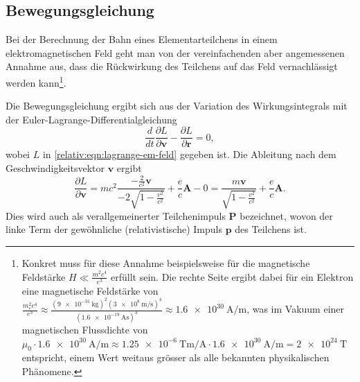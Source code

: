 \subsection{Bewegungsgleichung
\label{relativ:section:bewegungsgleichung}}

Bei der Berechnung der Bahn eines Elementarteilchens
in einem elektromagnetischen Feld geht man von
der vereinfachenden aber angemessenen Annahme aus,
dass die Rückwirkung des Teilchens auf das Feld vernachlässigt werden kann\footnote{
Konkret muss für diese Annahme beispielsweise
für die magnetische Feldstärke
\(H \ll \frac{m^2c^4}{e^3}\) erfüllt sein.
Die rechte Seite ergibt dabei für ein Elektron
eine magnetische Feldstärke von
\(\frac{m_e^2c^4}{e^3} \approx
\frac{(\qty{9e-31}{\kilogram})^2 (\qty{3e8}{\metre\per\second})^4}{(\qty{1.6e-19}{\ampere\second})^3}
\approx \qty[per-mode=fraction]{1.6e30}{\ampere\per\metre}\),
was im Vakuum einer magnetischen Flussdichte von
\(\mu_0 \cdot \qty[per-mode=fraction]{1.6e30}{\ampere\per\metre} \approx
\qty[per-mode=fraction]{1.25e-6}{\tesla\metre\per\ampere} \cdot
\qty[per-mode=fraction]{1.6e30}{\ampere\per\metre} =
\qty{2e24}{\tesla}\)
entspricht, einem Wert weitaus grösser als alle bekannten physikalischen Phänomene.}.

Die Bewegungsgleichung ergibt sich aus der Variation des Wirkungsintegrals
mit der Euler-Lagrange-Differentialgleichung
\begin{equation}
    \frac{d}{dt} \frac{\partial L}{\partial \mathbf{v}} - \frac{\partial L}{\partial \mathbf{r}} = 0,
    \label{realtiv:eqn:euler-lagrange-em-feld}
\end{equation}
wobei \(L\) in \eqref{relativ:eqn:lagrange-em-feld} gegeben ist.
Die Ableitung nach dem Geschwindigkeitsvektor \(\mathbf{v}\) ergibt
\begin{equation}
    \frac{\partial L}{\partial \mathbf{v}} =
    mc^2 \frac{-\frac{2}{c^2}\mathbf{v}}{-2\sqrt{1-\frac{v^2}{c^2}}}
    + \frac{e}{c} \mathbf{A} - 0
    = \frac{m \mathbf{v}}{\sqrt{1-\frac{v^2}{c^2}}} + \frac{e}{c} \mathbf{A}.
    \label{realtiv:eqn:part-diff-v}
\end{equation}
Dies wird auch als verallgemeinerter Teilchenimpuls \(\mathbf{P}\) bezeichnet,
wovon der linke Term der gewöhnliche (relativistische) Impuls \(\mathbf{p}\)
des Teilchens ist.

